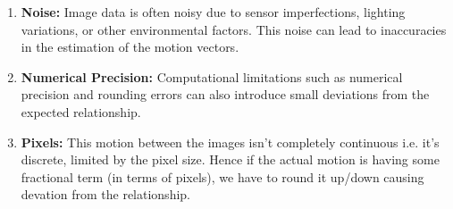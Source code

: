 \documentclass[12pt]{article}
\begin{document}
\vspace{-10pt}

\begin{enumerate}[itemsep=-0.25em]
    \item \textbf{Noise:} Image data is often noisy due to sensor imperfections, lighting variations, or other environmental factors. This noise can lead to inaccuracies in the estimation of the motion vectors.
    \item \textbf{Numerical Precision:} Computational limitations such as numerical precision and rounding errors can also introduce small deviations from the expected relationship.
    \item \textbf{Pixels:} This motion between the images isn’t completely continuous i.e. it’s discrete, limited by the pixel size. Hence if the actual motion is having some fractional term (in terms of pixels), we have to round it up/down causing devation from the relationship.
\end{enumerate}
\end{document}
